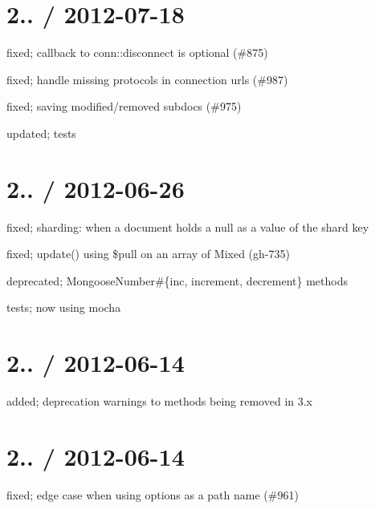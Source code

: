 \section*{2.. / 2012-\/07-\/18 }


\begin{DoxyItemize}
\item fixed; callback to conn\+::disconnect is optional (\#875)
\item fixed; handle missing protocols in connection urls (\#987)
\item fixed; saving modified/removed subdocs (\#975)
\item updated; tests
\end{DoxyItemize}

\section*{2.. / 2012-\/06-\/26 }


\begin{DoxyItemize}
\item fixed; sharding\+: when a document holds a null as a value of the shard key
\item fixed; update() using \$pull on an array of Mixed (gh-\/735)
\item deprecated; Mongoose\+Number\#\{inc, increment, decrement\} methods
\item tests; now using mocha
\end{DoxyItemize}

\section*{2.. / 2012-\/06-\/14 }


\begin{DoxyItemize}
\item added; deprecation warnings to methods being removed in 3.\+x
\end{DoxyItemize}

\section*{2.. / 2012-\/06-\/14 }


\begin{DoxyItemize}
\item fixed; edge case when using \textquotesingle{}options\textquotesingle{} as a path name (\#961)
\end{DoxyItemize}


